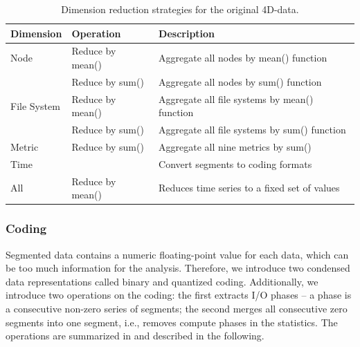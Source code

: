 \documentclass{jhps}
\begin{document}
\begin{table}
	\centering
	\begin{tabularx}{\textwidth}{llX}
		Dimension       & Operation                                    &  Description                                   \\
		\midrule
		Node            & Reduce by mean()                             &  Aggregate all nodes by mean() function        \\
		                & Reduce by sum()                              &  Aggregate all nodes by sum() function         \\
		File System     & Reduce by mean()                             &  Aggregate all file systems by mean() function \\
		                &
		Reduce by sum() & Aggregate all file systems by sum() function \\
		Metric          & Reduce by sum()                              &  Aggregate all nine metrics by sum()           \\
		Time            &                                              &  Convert segments to coding formats            \\
		All             & Reduce by mean()                             &  Reduces time series to a fixed set of values  \\
	\end{tabularx}
	\caption{Dimension reduction strategies for the original 4D-data.}
	\label{tab:reduction_techniques}
\end{table}

\subsubsection{Coding}


Segmented data contains a numeric floating-point value for each data, which can be too much information for the analysis.
Therefore, we introduce two condensed data representations called binary and quantized coding.
Additionally, we introduce two operations on the coding:
the first extracts I/O phases -- a phase is a consecutive non-zero series of segments;
the second merges all consecutive zero segments into one segment, i.e., removes compute phases in the statistics.
The operations are summarized in  and described in the following.
\end{document}
